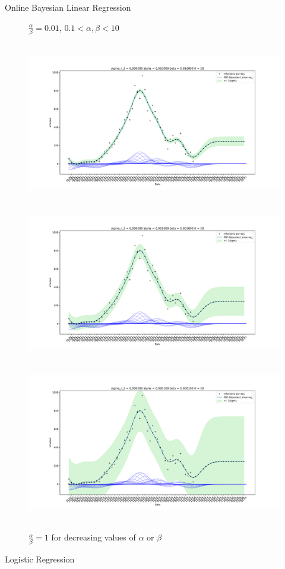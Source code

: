 \documentclass[english]{exercisesheet}
\begin{document}
\begin{nexercise}{Online Bayesian Linear Regression}
\begin{solution}
\begin{figure}
        \caption{$\frac{\alpha}{\beta}=0.01$, $0.1 <\alpha, \beta < 10$ }
        \end{figure}
        \cleardoublepage
        \begin{figure}
        \includegraphics[width=1\textwidth, height=7cm]{15.pdf}
        \includegraphics[width=1\textwidth, height=7cm]{16.pdf}
        \includegraphics[width=1\textwidth, height=7cm]{14.pdf}
        \caption{$\frac{\alpha}{\beta}=1$ for decreasing values of $\alpha$ or $\beta$}
        \end{figure}
      \end{solution}
 \end{nexercise}
\cleardoublepage
 \begin{nexercise}{Logistic Regression}
\end{nexercise}
\end{document}
